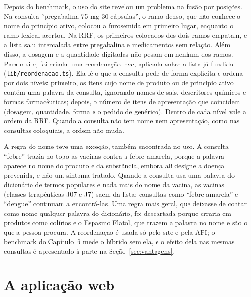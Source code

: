\documentclass[12pt,oneside,a4paper,english,brazil]{abntex2}
\newcommand{\campo}[1]{\texttt{#1}}
\begin{document}
Depois do benchmark, o uso do site revelou um problema na fusão por posições. Na consulta ``pregabalina 75 mg 30 cápsulas'', o ramo denso, que não conhece o nome do princípio ativo, colocou a furosemida em primeiro lugar, enquanto o ramo lexical acertou. Na RRF, os primeiros colocados dos dois ramos empatam, e a lista saiu intercalada entre pregabalina e medicamentos sem relação. Além disso, a dosagem e a quantidade digitadas não pesam em nenhum dos ramos. Para o site, foi criada uma reordenação leve, aplicada sobre a lista já fundida (\campo{lib/reordenacao.ts}). Ela lê o que a consulta pede de forma explícita e ordena por dois níveis: primeiro, os itens cujo nome de produto ou de princípio ativo contém uma palavra da consulta, ignorando nomes de sais, descritores químicos e formas farmacêuticas; depois, o número de itens de apresentação que coincidem (dosagem, quantidade, forma e o pedido de genérico). Dentro de cada nível vale a ordem da RRF. Quando a consulta não tem nome nem apresentação, como nas consultas coloquiais, a ordem não muda.

A regra do nome teve uma exceção, também encontrada no uso. A consulta ``febre'' trazia no topo as vacinas contra a febre amarela, porque a palavra aparece no nome do produto e da substância, embora ali designe a doença prevenida, e não um sintoma tratado. Quando a consulta usa uma palavra do dicionário de termos populares e nada mais do nome da vacina, as vacinas (classes terapêuticas J07 e J7) saem da lista; consultas como ``febre amarela'' e ``dengue'' continuam a encontrá-las. Uma regra mais geral, que deixasse de contar como nome qualquer palavra do dicionário, foi descartada porque erraria em produtos como colírios e o Espasmo Flatol, que trazem a palavra no nome e são o que a pessoa procura. A reordenação é usada só pelo site e pela API; o benchmark do Capítulo~6 mede o híbrido sem ela, e o efeito dela nas mesmas consultas é apresentado à parte na Seção~\ref{sec:vantagens}.

\section{A aplicação web}
\label{sec:aplicacao}
\end{document}
